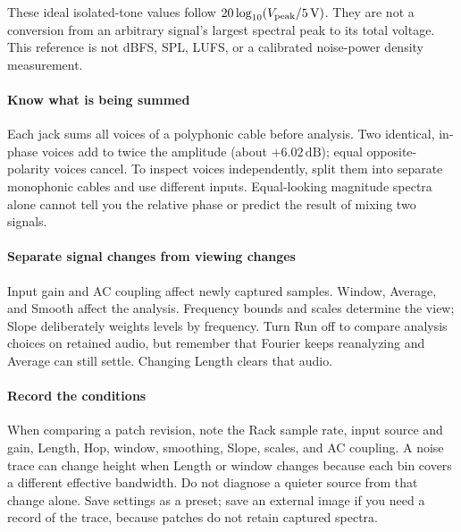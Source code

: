 These ideal isolated-tone values follow $20\log_{10}(V_{\rm peak}/5\,\mathrm{V})$.
They are not a conversion from an arbitrary signal's largest spectral peak
to its total voltage. This reference is not dBFS, SPL, LUFS, or a calibrated
noise-power density measurement.

\paragraph{Know what is being summed}
Each jack sums all voices of a polyphonic cable before analysis. Two identical,
in-phase voices add to twice the amplitude (about $+6.02\,\mathrm{dB}$);
equal opposite-polarity voices cancel. To inspect voices independently, split
them into separate monophonic cables and use different inputs. Equal-looking
magnitude spectra alone cannot tell you the relative phase or predict the
result of mixing two signals.

\paragraph{Separate signal changes from viewing changes}
Input gain and AC coupling affect newly captured samples. Window, Average,
and Smooth affect the analysis. Frequency bounds and scales determine the
view; Slope deliberately weights levels by frequency. Turn Run off to compare
analysis choices on retained audio, but remember that Fourier keeps
reanalyzing and Average can still settle. Changing Length clears that audio.

\paragraph{Record the conditions}
When comparing a patch revision, note the Rack sample rate, input source and
gain, Length, Hop, window, smoothing, Slope, scales, and AC coupling. A noise
trace can change height when Length or window changes because each bin covers
a different effective bandwidth. Do not diagnose a quieter source from that
change alone. Save settings as a preset; save an external image if you need a
record of the trace, because patches do not retain captured spectra.
